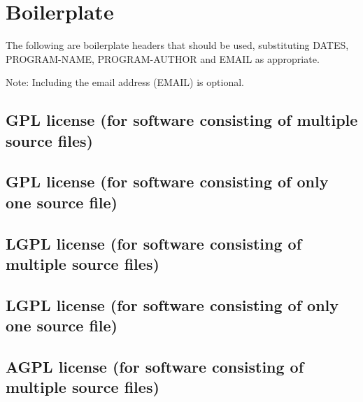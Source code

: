 \documentclass[10pt,a4paper]{article}
\begin{document}
\appendix

\section{Boilerplate}
\label{appendix:boilerplate}

The following are boilerplate headers that should be used, substituting 
DATES, PROGRAM-NAME, PROGRAM-AUTHOR and EMAIL as appropriate.

Note: Including the email address (EMAIL) is optional. 

\subsection{GPL license (for software consisting of multiple source files)}

\begin{boilerplate}

\end{boilerplate}

\subsection{GPL license (for software consisting of only one source file)}
\begin{boilerplate}

\end{boilerplate}

\subsection{LGPL license (for software consisting of multiple source files)}
\begin{boilerplate}

\end{boilerplate}

\subsection{LGPL license (for software consisting of only one source file)}
\begin{boilerplate}

\end{boilerplate}

\subsection{AGPL license (for software consisting of multiple source files)}
\begin{boilerplate}

\end{boilerplate}
\end{document}
